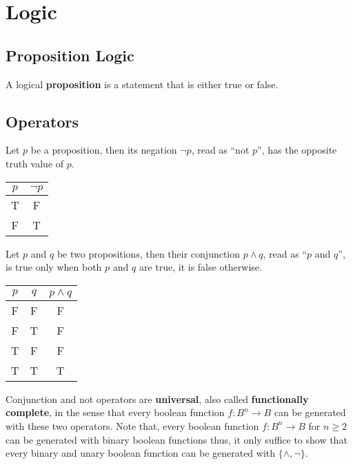 \chapter{Logic}
\section{Proposition Logic}
\thispagestyle{headings}
A logical \textbf{proposition} is a statement that is either true or false.
\section{Operators}
\begin{definition} [Negation]
Let \(p\) be a proposition, then its negation \(\neg p\), read as ``not \(p\)'', has the opposite truth value of \(p\).
\begin{center}
    \begin{tabular}[c]{c | c}
        \(p\) & \(\neg p\) \\ \hline
        T     & F          \\
        F     & T
    \end{tabular}
\end{center}
\end {definition}

\begin{definition}[Conjunction]
    Let \(p\) and \(q\) be two propositions, then their conjunction \(p \land q\), read as ``\(p\) and \(q\)'', is true only when both \(p\) and \(q\) are true, it is false otherwise.
    \begin{center}
        \begin{tabular}[c]{c  c | c}
            \(p\) & \(q\) & \(p \land q\) \\ \hline
            F     & F     & F             \\
            F     & T     & F             \\
            T     & F     & F             \\
            T     & T     & T             \\
        \end{tabular}
    \end{center}
\end{definition}

Conjunction and not operators are \textbf{universal}, also called \textbf{functionally complete}, in the sense that every boolean function \(f: B^n \to B\) can be generated with these two operators. Note that, every boolean function \(f : B^n \to B\) for \(n \geq 2\) can be generated with binary boolean functions thus, it only suffice to show that every binary and unary boolean function can be generated with \(\{\land, \neg\}\).


